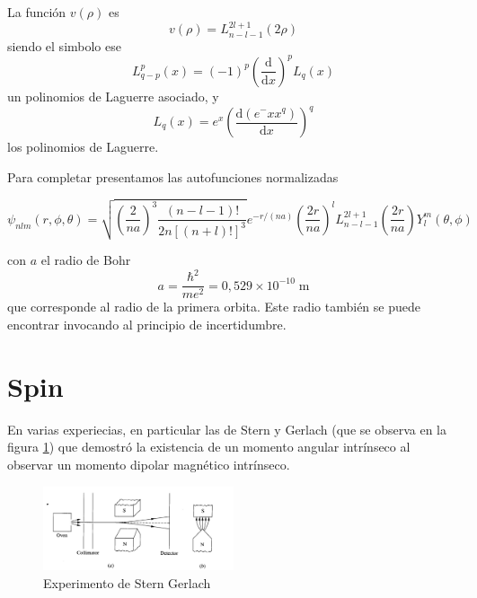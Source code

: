 \documentclass{book}
\numberwithin{equation}{section} %
\begin{document}
La función $v(\rho)$ es 
\begin{equation}
    v(\rho) = L^{2l + 1}_{n - l -1}(2\rho)
\end{equation}
siendo el simbolo ese
\begin{equation}
    L^{p}_{q - p}(x) = (-1)^p \left(\frac{\mathrm{d}}{\mathrm{d}x}\right)^p L_q(x)
\end{equation}
un polinomios de Laguerre asociado, y
\begin{equation}
    L_q(x) = e^x \left(\frac{\mathrm{d} (e^-x x^q)}{\mathrm{d}x}\right)^q
\end{equation}
los polinomios de Laguerre.

Para completar presentamos las autofunciones normalizadas

\begin{equation}
    \psi_{nlm}(r,\phi,\theta) = \sqrt{\left(\frac{2}{n a}\right)^3 \frac{(n - l - 1)!}{2n[(n + l)!]^3}} e^{-r/(na)} \left(\frac{2r}{na}\right)^l L^{2l + 1}_{n - l - 1}\left(\frac{2r}{na}\right) Y^{m}_{l}(\theta, \phi)
\end{equation}

con $a$ el radio de Bohr
\begin{equation}
    a = \frac{\hbar^2}{m e^2} = 0,529 \times 10^{-10}\;\text{m}
\end{equation}
que corresponde al radio de la primera orbita.
Este radio también se puede encontrar invocando al principio de incertidumbre.

\section{Spin}

En varias experiecias, en particular las de Stern y Gerlach (que se observa en la figura \ref{fig:stern_gerlach}) que demostró la existencia de un momento angular intrínseco al observar un momento dipolar magnético intrínseco.

\begin{figure}[H]
    \centering
    \includegraphics[width=0.5\textwidth]{stern_gerlach}
    \caption{Experimento de Stern Gerlach}
    \label{fig:stern_gerlach}
\end{figure}
\end{document}
